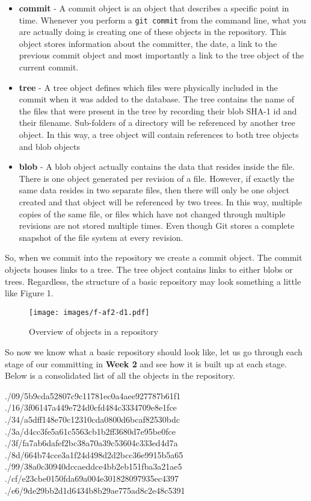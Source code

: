 \begin{itemize}
\item\textbf{commit} - A commit object is an object that describes a specific point in time.
Whenever you perform a \texttt{git commit} from the command line, what you are actually doing is creating one of these objects in the repository.
This object stores information about the committer, the date, a link to the previous commit object and most importantly a link to the tree object of the current commit.
\item\textbf{tree} - A tree object defines which files were physically included in the commit when it was added to the database.
The tree contains the name of the files that were present in the tree by recording their blob SHA-1 id and their filename.
Sub-folders of a directory will be referenced by another tree object.
In this way, a tree object will contain references to both tree objects and blob objects
\item\textbf{blob} - A blob object actually contains the data that resides inside the file.
There is one object generated per revision of a file.
However, if exactly the same data resides in two separate files, then there will only be one object created and that object will be referenced by two trees.
In this way, multiple copies of the same file, or files which have not changed through multiple revisions are not stored multiple times.
Even though Git stores a complete snapshot of the file system at every revision.
\end{itemize}

So, when we commit into the repository we create a commit object.
The commit objects houses links to a tree.
The tree object contains links to either blobs or trees.
Regardless, the structure of a basic repository may look something a little like Figure 1.

\begin{figure}[hbt]
\centering
\texttt{[image: images/f-af2-d1.pdf]}
\caption{Overview of objects in a repository}
\end{figure}

So now we know what a basic repository should look like, let us go through each stage of our committing in \textbf{Week 2} and see how it is built up at each stage.
Below is a consolidated list of all the objects in the repository.

\begin{code}
./09/5b9cda52807c9c11781ec0a4aee927787b61f1
./16/3f06147a449e724d0cfd484c3334709e8e1fce
./34/a5dff148e70c12310cda0800d6bcaf82530bdc
./3a/d4cc3fe5a61c5563cb1b2ff3680d7e95be0fce
./3f/fa7ab6dafef2bc38a70a39c53604c333ed4d7a
./8d/664b74cce3a1f24d498d2d2bcc36e9915b5a65
./99/38a0c30940dccaeddce4bb2eb151fba3a21ae5
./cf/e23cbe0150fda69a004e301828097935ec4397
./e6/9de29bb2d1d6434b8b29ae775ad8c2e48c5391
\end{code}

